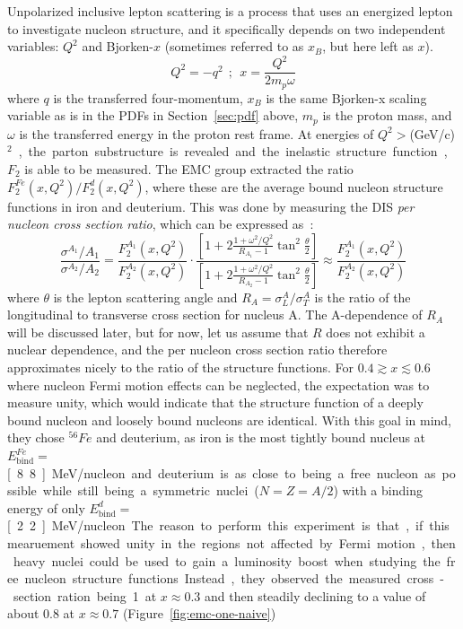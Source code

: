 Unpolarized inclusive lepton scattering is a process that uses an energized lepton to investigate nucleon structure, and it specifically depends on two independent variables: $Q^2$ and Bjorken-$x$ (sometimes referred to as $x_B$, but here left as $x$).
\begin{equation}
Q^2 = -q^2\ \ ;\ \ x = \frac{Q^2}{2 m_p \omega}
\end{equation}
where $q$ is the transferred four-momentum, $x_B$ is the same Bjorken-x scaling variable as is in the PDFs in Section~\ref{sec:pdf} above, $m_p$ is the proton mass, and $\omega$ is the transferred energy in the proton rest frame. At energies of $Q^2>$\unit[2]{(GeV/c)$^2$}, the parton substructure is revealed and the inelastic structure function, $F_2$ is able to be measured. The EMC group extracted the ratio $F_2^{Fe}(x,Q^2)/F_2^{d}(x,Q^2)$, where these are the average bound nucleon structure functions in iron and deuterium. This was done by measuring the DIS \emph{per nucleon cross section ratio}, which can be expressed as~\cite{Halzen:1984mc}:
\begin{equation}
\frac{\sigma^{A_1}/A_1}{\sigma^{A_2}/A_2} = \frac{F_2^{A_1}(x, Q^2)}{F_2^{A_2}(x, Q^2)} \cdot \frac{\left[ 1 + 2\frac{1+\omega^2/Q^2}{R_{A_1}-1}\tan^2\frac{\theta}{2} \right]}{\left[ 1 + 2\frac{1+\omega^2/Q^2}{R_{A_2}-1}\tan^2\frac{\theta}{2} \right]} \approx \frac{F_2^{A_1}(x, Q^2)}{F_2^{A_2}(x, Q^2)}
\end{equation}
where $\theta$ is the lepton scattering angle and $R_A=\sigma^A_L/\sigma^A_T$ is the ratio of the longitudinal to transverse cross section for nucleus A. The A-dependence of $R_A$ will be discussed later, but for now, let us assume that $R$ does not exhibit a nuclear dependence, and the per nucleon cross section ratio therefore approximates nicely to the ratio of the structure functions. For $0.4\gtrsim x\lesssim0.6$ where nucleon Fermi motion effects can be neglected, the expectation was to measure unity, which would indicate that the structure function of a deeply bound nucleon and loosely bound nucleons are identical. With this goal in mind, they chose $^{56}Fe$ and deuterium, as iron is the most tightly bound nucleus at $E^{Fe}_{\text{bind}}=$\unit[8.8]{MeV/nucleon} and deuterium is as close to being a free nucleon as possible while still being a symmetric nuclei ($N=Z=A/2$) with a binding energy of only $E^{d}_{\text{bind}}=$\unit[2.2]{MeV/nucleon}. The reason to perform this experiment is that, if this mearuement showed unity in the regions not affected by Fermi motion, then heavy nuclei could be used to gain a luminosity boost when studying the free nucleon structure functions. Instead, they observed the measured cross-section ration being 1 at $x\approx 0.3$ and then steadily declining to a value of about 0.8 at $x\approx0.7$ (Figure~\ref{fig:emc-one-naive})    


